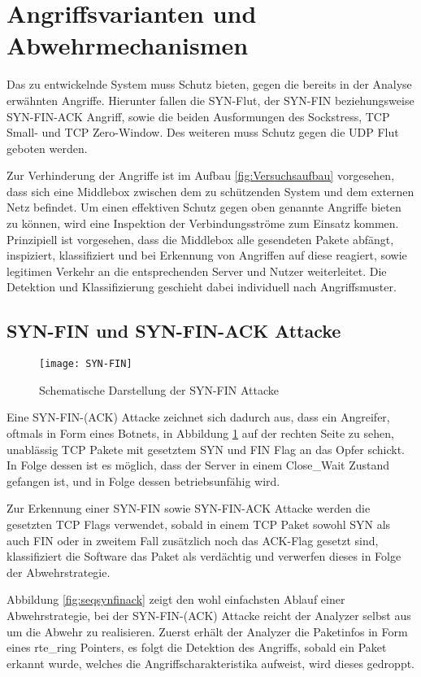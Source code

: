 \documentclass[../review_1.tex]{subfiles}
\begin{document}
\section{Angriffsvarianten und Abwehrmechanismen}
Das zu entwickelnde System muss Schutz bieten, gegen die bereits in der Analyse erwähnten Angriffe. Hierunter fallen die SYN-Flut, der SYN-FIN beziehungsweise SYN-FIN-ACK Angriff, sowie die beiden Ausformungen des Sockstress, TCP Small- und TCP Zero-Window. Des weiteren muss Schutz gegen die UDP Flut geboten werden.

Zur Verhinderung der Angriffe ist im Aufbau \ref{fig:Versuchsaufbau} vorgesehen, dass sich eine Middlebox zwischen dem zu schützenden System und dem externen Netz befindet. Um einen effektiven Schutz gegen oben genannte Angriffe bieten zu können, wird eine Inspektion der Verbindungsströme zum Einsatz kommen. Prinzipiell ist vorgesehen, dass die Middlebox alle gesendeten Pakete abfängt, inspiziert, klassifiziert und bei Erkennung von Angriffen auf diese reagiert, sowie legitimen Verkehr an die entsprechenden Server und Nutzer weiterleitet. Die Detektion und Klassifizierung geschieht dabei individuell nach Angriffsmuster.

\subsection{SYN-FIN und SYN-FIN-ACK Attacke}
\begin{figure}[t]
    \centering
    \texttt{[image: SYN-FIN]}
    \caption{Schematische Darstellung der SYN-FIN Attacke}
    \label{fig:SYN-FIN}
\end{figure}

Eine SYN-FIN-(ACK) Attacke zeichnet sich dadurch aus, dass ein Angreifer, oftmals in Form eines Botnets, in Abbildung \ref{fig:SYN-FIN} auf der rechten Seite zu sehen, unablässig TCP Pakete mit gesetztem SYN und FIN Flag an das Opfer schickt. In Folge dessen ist es möglich, dass der Server in einem Close\_Wait Zustand gefangen ist, und in Folge dessen betriebsunfähig wird.

Zur Erkennung einer SYN-FIN sowie SYN-FIN-ACK Attacke werden die gesetzten TCP Flags verwendet, sobald in einem TCP Paket sowohl SYN als auch FIN oder in zweitem Fall zusätzlich noch das ACK-Flag gesetzt sind, klassifiziert die Software das Paket als verdächtig und verwerfen dieses in Folge der Abwehrstrategie.

Abbildung \ref{fig:seqsynfinack} zeigt den wohl einfachsten Ablauf einer Abwehrstrategie, bei der SYN-FIN-(ACK) Attacke reicht der Analyzer selbst aus um die Abwehr zu realisieren. Zuerst erhält der Analyzer die Paketinfos in Form eines rte\_ring Pointers, es folgt die Detektion des Angriffs, sobald ein Paket erkannt wurde, welches die Angriffscharakteristika aufweist, wird dieses gedroppt.
\end{document}
